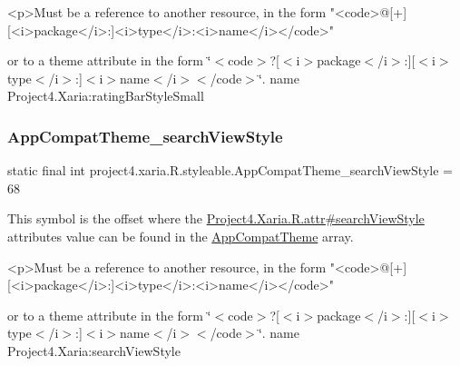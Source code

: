 \begin{DoxyVerb}      <p>Must be a reference to another resource, in the form "<code>@[+][<i>package</i>:]<i>type</i>:<i>name</i></code>"
\end{DoxyVerb}
 or to a theme attribute in the form \char`\"{}$<$code$>$?\mbox{[}$<$i$>$package$<$/i$>$\+:\mbox{]}\mbox{[}$<$i$>$type$<$/i$>$\+:\mbox{]}$<$i$>$name$<$/i$>$$<$/code$>$\char`\"{}.  name Project4.\+Xaria\+:rating\+Bar\+Style\+Small \mbox{\label{classproject4_1_1xaria_1_1R_1_1styleable_ad924c1e6f178ccfee69b445c201c2e63}} 
\subsubsection{\texorpdfstring{App\+Compat\+Theme\+\_\+search\+View\+Style}{AppCompatTheme\_searchViewStyle}}
{\footnotesize\ttfamily static final int project4.\+xaria.\+R.\+styleable.\+App\+Compat\+Theme\+\_\+search\+View\+Style = 68\hspace{0.3cm}{\ttfamily [static]}}

This symbol is the offset where the \hyperlink{}{Project4.\+Xaria.\+R.\+attr\#search\+View\+Style} attribute\textquotesingle{}s value can be found in the \hyperlink{classproject4_1_1xaria_1_1R_1_1styleable_aad8bec413e2350f9404e6ff0e831a85d}{App\+Compat\+Theme} array.

\begin{DoxyVerb}      <p>Must be a reference to another resource, in the form "<code>@[+][<i>package</i>:]<i>type</i>:<i>name</i></code>"
\end{DoxyVerb}
 or to a theme attribute in the form \char`\"{}$<$code$>$?\mbox{[}$<$i$>$package$<$/i$>$\+:\mbox{]}\mbox{[}$<$i$>$type$<$/i$>$\+:\mbox{]}$<$i$>$name$<$/i$>$$<$/code$>$\char`\"{}.  name Project4.\+Xaria\+:search\+View\+Style \mbox{\label{classproject4_1_1xaria_1_1R_1_1styleable_a443f701138b45301d896b25f88f24834}} 
